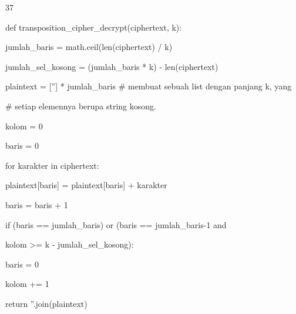 \documentclass{article}
\begin{document}

37

def transposition\_cipher\_decrypt(ciphertext, k):

    jumlah\_baris = math.ceil(len(ciphertext) / k)

    jumlah\_sel\_kosong = (jumlah\_baris * k) - len(ciphertext)

    plaintext = [''] * jumlah\_baris     \# membuat sebuah list dengan panjang k, yang

                                        \# setiap elemennya berupa string kosong. 

    kolom = 0

    baris = 0

    for karakter in ciphertext:

        plaintext[baris] = plaintext[baris] + karakter

        baris = baris + 1

        if (baris == jumlah\_baris) or (baris == jumlah\_baris-1 and 

                                       kolom >= k - jumlah\_sel\_kosong):

            baris = 0

            kolom += 1

    return ''.join(plaintext)
\end{document}
